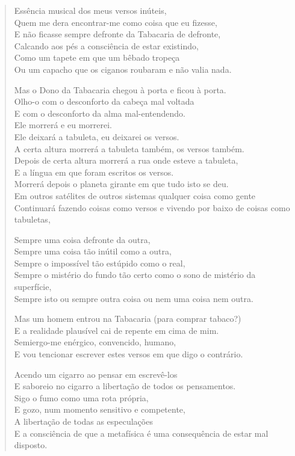 \documentclass[10pt,a5paper,oneside]{book}
\begin{document}
\begin{verse}
Essência musical dos meus versos inúteis,\\
Quem me dera encontrar-me como coisa que eu fizesse,\\
E não ficasse sempre defronte da Tabacaria de defronte,\\
Calcando aos pés a consciência de estar existindo,\\
Como um tapete em que um bêbado tropeça\\
Ou um capacho que os ciganos roubaram e não valia nada.

Mas o Dono da Tabacaria chegou à porta e ficou à porta.\\
Olho-o com o desconforto da cabeça mal voltada\\
E com o desconforto da alma mal-entendendo.\\
Ele morrerá e eu morrerei.\\
Ele deixará a tabuleta, eu deixarei os versos.\\
A certa altura morrerá a tabuleta também, os versos também.\\
Depois de certa altura morrerá a rua onde esteve a tabuleta,\\
E a língua em que foram escritos os versos.\\
Morrerá depois o planeta girante em que tudo isto se deu.\\
Em outros satélites de outros sistemas qualquer coisa como gente\\
Continuará fazendo coisas como versos e vivendo por baixo de coisas como tabuletas,

Sempre uma coisa defronte da outra,\\
Sempre uma coisa tão inútil como a outra,\\
Sempre o impossível tão estúpido como o real,\\
Sempre o mistério do fundo tão certo como o sono de mistério da superfície,\\
Sempre isto ou sempre outra coisa ou nem uma coisa nem outra.

Mas um homem entrou na Tabacaria (para comprar tabaco?)\\
E a realidade plausível cai de repente em cima de mim.\\
Semiergo-me enérgico, convencido, humano,\\
E vou tencionar escrever estes versos em que digo o contrário.

Acendo um cigarro ao pensar em escrevê-los\\
E saboreio no cigarro a libertação de todos os pensamentos.\\
Sigo o fumo como uma rota própria,\\
E gozo, num momento sensitivo e competente,\\
A libertação de todas as especulações\\
E a consciência de que a metafísica é uma consequência de estar mal disposto.


\end{verse}
\end{document}

